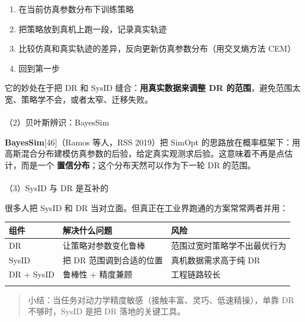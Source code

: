 \documentclass[
  chinese,
]{ctexart}
\makeatletter
\let\oldparagraph\paragraph
\renewcommand{\paragraph}{
    \@ifstar
      \xxxParagraphStar
      \xxxParagraphNoStar
  }
\newcommand{\xxxParagraphStar}[1]{\oldparagraph*{#1}\mbox{}}
\newcommand{\xxxParagraphNoStar}[1]{\oldparagraph{#1}\mbox{}}
\providecommand{\tightlist}{%
  \setlength{\itemsep}{0pt}\setlength{\parskip}{0pt}}
\makeatother
\begin{document}
\begin{enumerate}
\def\labelenumi{\arabic{enumi}.}
\tightlist
\item
  在当前仿真参数分布下训练策略
\item
  把策略放到真机上跑一段，记录真实轨迹
\item
  比较仿真和真实轨迹的差异，反向更新仿真参数分布（用交叉熵方法 CEM）
\item
  回到第一步
\end{enumerate}

它的妙处在于把 DR 和 SysID 缝合：\textbf{用真实数据来调整 DR
的范围}，避免范围太宽、策略学不会，或者太窄、迁移失败。

\paragraph{（2）贝叶斯辨识：BayesSim}\label{ux8d1dux53f6ux65afux8fa8ux8bc6bayessim}

\textbf{BayesSim}{[}46{]}（Ramos 等人，RSS 2019）把 SimOpt
的思路放在概率框架下：用高斯混合分布建模仿真参数的后验，给定真实观测求后验。这意味着不再是点估计，而是一个
\textbf{置信分布}；这个分布天然可以作为下一轮 DR 的范围。

\paragraph{（3）SysID 与 DR
是互补的}\label{sysid-ux4e0e-dr-ux662fux4e92ux8865ux7684}

很多人把 SysID 和 DR 当对立面。但真正在工业界跑通的方案常常两者并用：

\begin{center}
\begin{tabular}{@{}>{\raggedright\arraybackslash}p{} >{\raggedright\arraybackslash}p{} >{\raggedright\arraybackslash}p{}@{}}
\toprule\noalign{}
组件 & 解决什么问题 & 风险 \\
\midrule\noalign{}
DR & 让策略对参数变化鲁棒 & 范围过宽时策略学不出最优行为 \\
SysID & 把 DR 范围调到合适的位置 & 真机数据需求高于纯 DR \\
DR + SysID & 鲁棒性 + 精度兼顾 & 工程链路较长 \\
\bottomrule\noalign{}
\end{tabular}
\end{center}

\begin{quote}
小结：当任务对动力学精度敏感（接触丰富、灵巧、低速精操），单靠 DR
不够时，SysID 是把 DR 落地的关键工具。
\end{quote}
\end{document}
